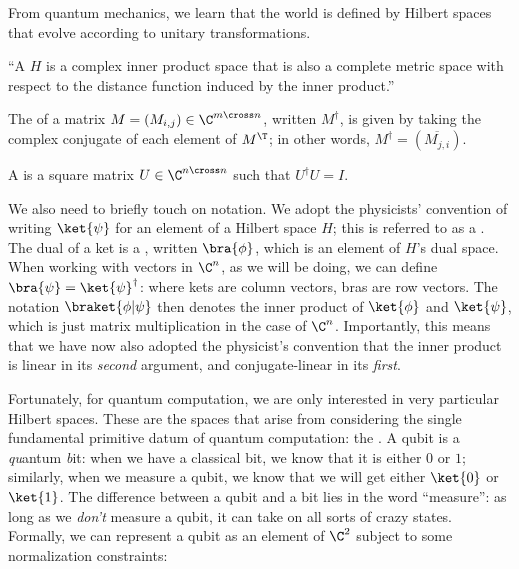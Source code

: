 From quantum mechanics, we learn that the world is defined by Hilbert spaces
that evolve according to unitary transformations.

\begin{definition}\label{def:hilbert-space}
    ``A  $H$ is a complex
  inner product space that is also a complete metric space with respect to the
  distance function induced by the inner product.''
\end{definition}

\begin{definition}\label{def:conjugate-transpose}
  The  of a matrix $M = (M_{i,j}) \in \C^{m \cross
  n}$, written $M^\dag$, is given by taking the complex conjugate of each
  element of $M^\T$; in other words, $M^\dag = (\overline{M_{j,i}})$.
\end{definition}

\begin{definition}\label{def:unitary-matrix}
  A  is a square matrix $U \in \C^{n \cross n}$ such that
  $U^\dag U = I$.
\end{definition}

We also need to briefly touch on notation.  We adopt the physicists' convention
of writing $\ket{\psi}$ for an element of a Hilbert space $H$; this is referred
to as a .  The dual of a ket is a , written $\bra{\phi}$,
which is an element of $H$'s dual space.  When working with vectors in $\C^n$,
as we will be doing, we can define $\bra{\psi} = \ket{\psi}^\dag$: where kets
are column vectors, bras are row vectors.  The notation $\braket{\phi | \psi}$
then denotes the inner product of $\ket{\phi}$ and $\ket{\psi}$, which is just
matrix multiplication in the case of $\C^n$.  Importantly, this means that we
have now also adopted the physicist's convention that the inner product is
linear in its \emph{second} argument, and conjugate-linear in its \emph{first}.

Fortunately, for quantum computation, we are only interested in very particular
Hilbert spaces.  These are the spaces that arise from considering the single
fundamental primitive datum of quantum computation: the .  A qubit
is a \emph{qu}antum \emph{b}it: when we have a classical bit, we know that it is
either $0$ or $1$; similarly, when we measure a qubit, we know that we will get
either $\ket{0}$ or $\ket{1}$.  The difference between a qubit and a bit lies in
the word ``measure'': as long as we \emph{don't} measure a qubit, it can take on
all sorts of crazy states.  Formally, we can represent a qubit as an element of
$\C^2$ subject to some normalization constraints:

